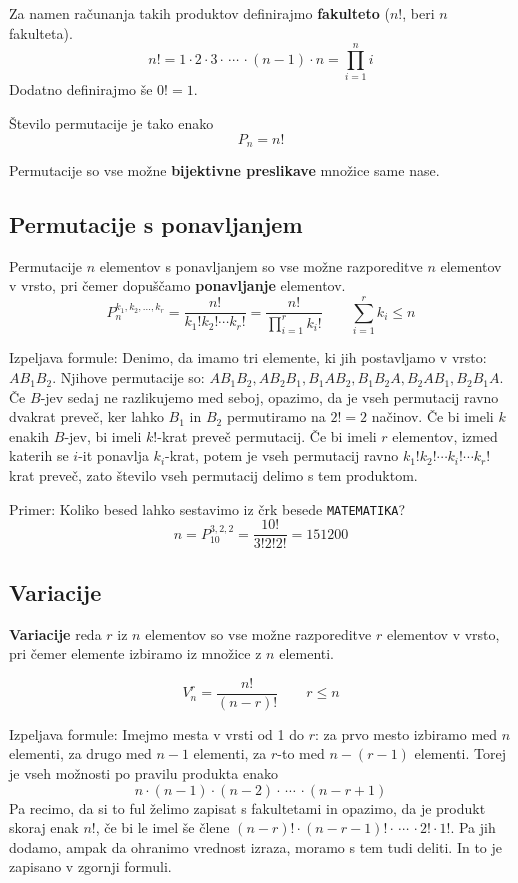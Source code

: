 \documentclass[a4paper,oneside,12pt,fleqn]{article}
\newcommand\krat\cdot
\numberwithin{equation}{section}
\begin{document}
Za namen računanja takih produktov definirajmo \textbf{fakulteto} ($n!$, beri $n$
fakulteta).
\[ n! = 1 \krat 2 \krat 3 \krat \,\cdots\, \krat (n-1) \krat n = \prod_{i=1}^ni \]
Dodatno definirajmo še $0! = 1$.

Število permutacije je tako enako
\[ P_n = n! \]

Permutacije so vse možne \textbf{bijektivne preslikave} množice same nase.

\subsection{Permutacije s ponavljanjem}
\label{sec:komb:ppon}
Permutacije $n$ elementov s ponavljanjem so vse možne razporeditve $n$ elementov v vrsto,
pri čemer dopuščamo \textbf{ponavljanje} elementov. 
\[ P_n^{k_1,k_2,\ldots,k_r} = \frac{n!}{k_1!k_2!\cdots k_r!} =
\frac{n!}{\displaystyle \prod_{i=1}^rk_i!} \qquad \sum_{i=1}^rk_i \le n \]

Izpeljava formule: Denimo, da imamo tri elemente, ki jih postavljamo v vrsto: $AB_1B_2$.
Njihove permutacije so: $AB_1B_2, AB_2B_1, B_1AB_2, B_1B_2A, B_2AB_1, B_2B_1A$.
Če $B$-jev sedaj ne razlikujemo med seboj, opazimo, da je vseh permutacij ravno dvakrat
preveč, ker lahko $B_1$ in $B_2$ permutiramo na $2! = 2$ načinov. Če bi imeli $k$ enakih
$B$-jev, bi imeli $k!$-krat preveč permutacij. Če bi imeli $r$
elementov, izmed katerih se $i$-it ponavlja $k_i$-krat, potem je vseh permutacij ravno 
$k_1!k_2! \cdots k_i! \cdots k_r!$ krat preveč, zato število vseh permutacij delimo s tem
produktom.

Primer: Koliko besed lahko sestavimo iz črk besede \texttt{MATEMATIKA}?
\[ n = P_{10}^{3,2,2} = \frac{10!}{3!2!2!} = 151200 \]

\subsection{Variacije}
\label{sec:komb:var}

\textbf{Variacije} reda $r$ iz $n$ elementov so vse možne razporeditve $r$ elementov v
vrsto, pri čemer elemente izbiramo iz množice z $n$ elementi.

\[ V_n^r = \frac{n!}{(n-r)!} \qquad r \le n \]

Izpeljava formule: Imejmo mesta v vrsti od 1 do $r$:
za prvo mesto izbiramo med $n$ elementi, za drugo med $n-1$ elementi, za $r$-to med
$n-(r-1)$ elementi. Torej je vseh možnosti po pravilu produkta enako
\[ n \krat (n-1) \krat (n-2) \krat \, \cdots \, \krat (n-r+1) \]
Pa recimo, da si to ful želimo zapisat s fakultetami in opazimo, da je produkt skoraj enak
$n!$, če bi le imel še člene $(n-r)!\krat(n-r-1)! \krat \, \cdots \, \krat 2!\krat
1!$. Pa jih dodamo, ampak da ohranimo vrednost izraza, moramo s tem tudi deliti. In to je
zapisano v zgornji formuli.
\end{document}
